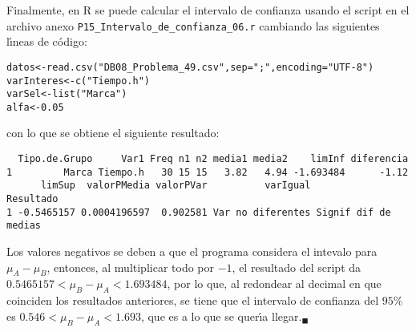\begin{solucion}
 Finalmente, en R se puede calcular el intervalo de confianza usando el script en el archivo anexo \texttt{P15\_Intervalo\_de\_confianza\_06.r} cambiando las siguientes l\'{\i}neas de c\'odigo:
 \begin{verbatim}
datos<-read.csv("DB08_Problema_49.csv",sep=";",encoding="UTF-8")
varInteres<-c("Tiempo.h")
varSel<-list("Marca")
alfa<-0.05
 \end{verbatim}
 \vspace{-0.5cm}
 con lo que se obtiene el siguiente resultado:
 \begin{verbatim}
  Tipo.de.Grupo     Var1 Freq n1 n2 media1 media2    limInf diferencia
1         Marca Tiempo.h   30 15 15   3.82   4.94 -1.693484      -1.12
      limSup  valorPMedia valorPVar          varIgual            Resultado
1 -0.5465157 0.0004196597  0.902581 Var no diferentes Signif dif de medias
 \end{verbatim}
 \vspace{-0.5cm}
 Los valores negativos se deben a que el programa considera el intevalo para $\mu_A - \mu_B$, entonces, al multiplicar todo por $-1$, el resultado del script da $0.5465157 < \mu_B - \mu_A < 1.693484$, por lo que, al redondear al decimal en que coinciden los resultados anteriores, se tiene que el intervalo de confianza del $95\%$ es $0.546 < \mu_B - \mu_A < 1.693$, que es a lo que se quer\'{\i}a llegar.${}_{\blacksquare}$
\end{solucion}
